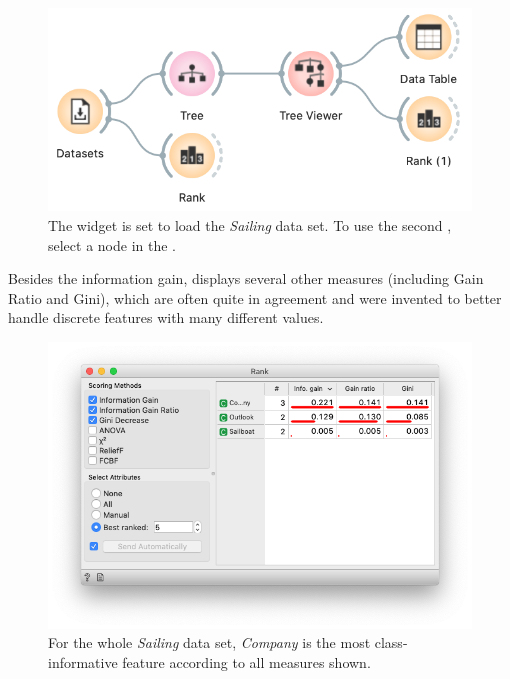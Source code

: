 \begin{figure}[h]
    \centering
    \includegraphics[scale=0.4]{graphics/ch-classification_trees/workflow-rank.png}
    \caption{The  widget is set to load the \textit{Sailing} data set. To use the second , select a node in the .}
\end{figure}

Besides the information gain,  displays several other measures (including Gain Ratio and Gini), which are often quite in agreement and were invented to better handle discrete features with many different values.

\begin{figure}[h]
    \centering
    \vspace{-0.2cm}
    \includegraphics[scale=0.4]{graphics/ch-classification_trees/rank.png}
    \caption{For the whole \textit{Sailing} data set, \textit{Company} is the most class-informative feature according to all measures shown.}
\end{figure}
